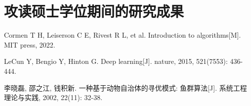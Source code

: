 
\chapter{攻读硕士学位期间的研究成果}

\begin{enumerate}[label = {[\arabic*]}]
    \item Cormen T H, Leiserson C E, Rivest R L, et al. Introduction to algorithms[M]. MIT press, 2022.
    \item LeCun Y, Bengio Y, Hinton G. Deep learning[J]. nature, 2015, 521(7553): 436-444.
    \item 李晓磊, 邵之江, 钱积新. 一种基于动物自治体的寻优模式: 鱼群算法[J]. 系统工程理论与实践, 2002, 22(11): 32-38.
\end{enumerate}

